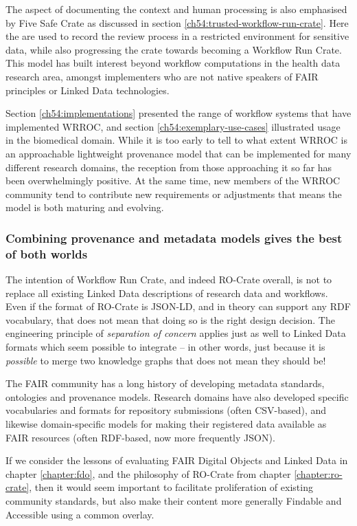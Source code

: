 The aspect of documenting the context and human processing is also emphasised by Five Safe Crate \cite{Soiland-Reyes 2023f} as discussed in section \vref{ch54:trusted-workflow-run-crate}. Here the \cite{SchemaOrgActions} are used to record the review process in a restricted environment for sensitive data, while also progressing the crate towards becoming a Workflow Run Crate. This model has built interest beyond workflow computations in the health data research area, amongst implementers who are not native speakers of FAIR principles or Linked Data technologies.

Section \vref{ch54:implementations} presented the range of workflow systems that have implemented WRROC, and section \vref{ch54:exemplary-use-cases} illustrated usage in the biomedical domain. While it is too early to tell to what extent WRROC is an approachable lightweight provenance model that can be implemented for many different research domains, the reception from those approaching it so far has been overwhelmingly positive. At the same time, new members of the WRROC community tend to contribute new requirements or adjustments that means the model is both maturing and evolving.


\subsubsection{Combining provenance and metadata models gives the best of both worlds}

The intention of Workflow Run Crate, and indeed RO-Crate overall, is not to replace all existing Linked Data descriptions of research data and workflows. Even if the format of RO-Crate is JSON-LD, and in theory can support any RDF vocabulary, that does not mean that doing so is the right design decision. The engineering principle of \emph{separation of concern} applies just as well to Linked Data formats which seem possible to integrate -- in other words, just because it is \emph{possible} to merge two knowledge graphs that does not mean they should be!

The FAIR community has a long history of developing metadata standards, ontologies and provenance models. Research domains have also developed specific vocabularies and formats for repository submissions (often CSV-based), and likewise domain-specific models for making their registered data available as FAIR resources (often RDF-based, now more frequently JSON). 

If we consider the lessons of evaluating FAIR Digital Objects and Linked Data in chapter \vref{chapter:fdo}, and the philosophy of RO-Crate from chapter \vref{chapter:ro-crate}, then it would seem important to facilitate proliferation of existing community standards, but also make their content more generally Findable and Accessible using a common overlay.


